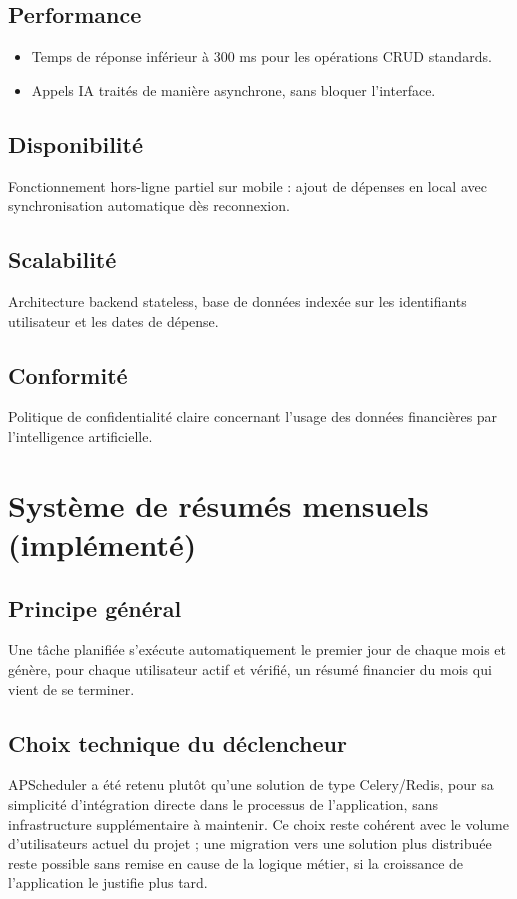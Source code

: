 \documentclass[11pt,a4paper]{article}
\begin{document}
\subsection{Performance}
\begin{itemize}[leftmargin=*]
    \item Temps de réponse inférieur à 300 ms pour les opérations CRUD standards.
    \item Appels IA traités de manière asynchrone, sans bloquer l'interface.
\end{itemize}

\subsection{Disponibilité}
Fonctionnement hors-ligne partiel sur mobile : ajout de dépenses en local avec synchronisation automatique dès reconnexion.

\subsection{Scalabilité}
Architecture backend stateless, base de données indexée sur les identifiants utilisateur et les dates de dépense.

\subsection{Conformité}
Politique de confidentialité claire concernant l'usage des données financières par l'intelligence artificielle.

\section{Système de résumés mensuels (implémenté)}

\subsection{Principe général}
Une tâche planifiée s'exécute automatiquement le premier jour de chaque mois et génère, pour chaque utilisateur actif et vérifié, un résumé financier du mois qui vient de se terminer.

\subsection{Choix technique du déclencheur}
APScheduler a été retenu plutôt qu'une solution de type Celery/Redis, pour sa simplicité d'intégration directe dans le processus de l'application, sans infrastructure supplémentaire à maintenir. Ce choix reste cohérent avec le volume d'utilisateurs actuel du projet ; une migration vers une solution plus distribuée reste possible sans remise en cause de la logique métier, si la croissance de l'application le justifie plus tard.
\end{document}
